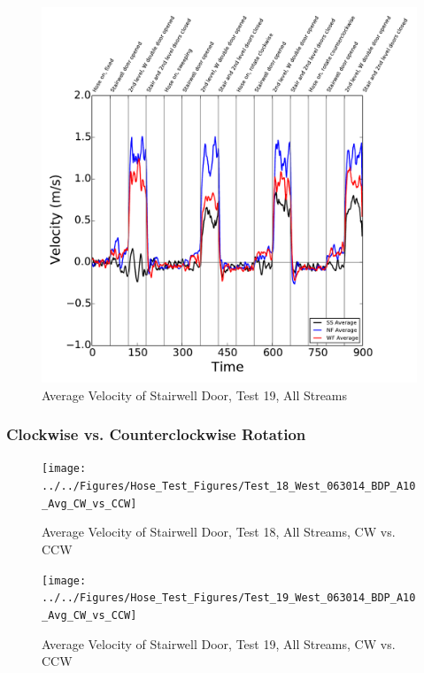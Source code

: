 \documentclass[12pt,oneside]{book}
\begin{document}
\begin{figure}[!ht]
\includegraphics[width=6in]{../../Figures/Hose_Test_Figures/Test_19_West_063014_BDP_A10_Avg}
\caption{Average Velocity of Stairwell Door, Test 19, All Streams}
\label{fig:Test_19_BDP_A10_Avg_All}
\end{figure}

\clearpage

\subsubsection{Clockwise vs. Counterclockwise Rotation}

\begin{figure}[!ht]
\texttt{[image: ../../Figures/Hose\_Test\_Figures/Test\_18\_West\_063014\_BDP\_A10\_Avg\_CW\_vs\_CCW]}
\caption{Average Velocity of Stairwell Door, Test 18, All Streams, CW vs. CCW}
\label{fig:Test_18_BDP_A10_Avg_CW_vs_CCW}
\end{figure}

\begin{figure}[!ht]
\texttt{[image: ../../Figures/Hose\_Test\_Figures/Test\_19\_West\_063014\_BDP\_A10\_Avg\_CW\_vs\_CCW]}
\caption{Average Velocity of Stairwell Door, Test 19, All Streams, CW vs. CCW}
\label{fig:Test_19_BDP_A10_Avg_CW_vs_CCW}
\end{figure}
\end{document}
